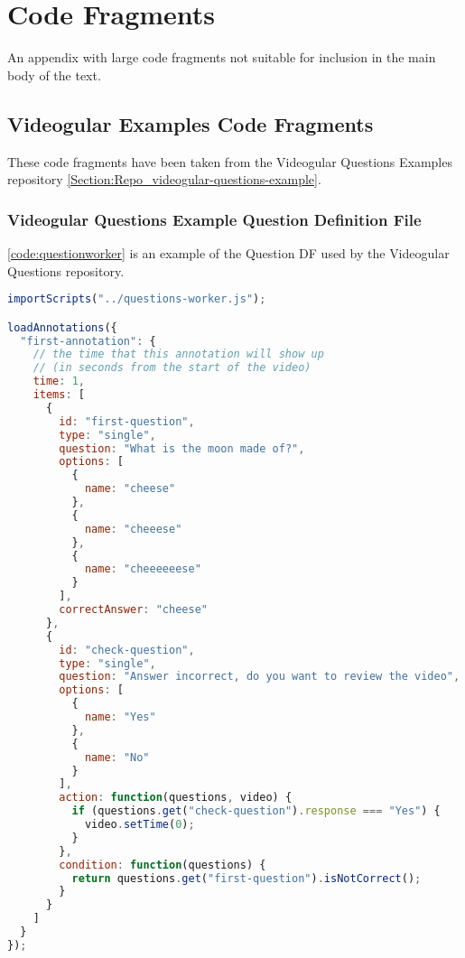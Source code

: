 \chapter{Code Fragments} \label{App:Code Fragments}

\begin{preamble}
	An appendix with large code fragments not suitable for inclusion in the main body of the text.
\end{preamble}

\section{Videogular Examples Code Fragments}

These code fragments have been taken from the Videogular Questions Examples repository \autoref{Section:Repo_videogular-questions-example}.

\subsection{Videogular Questions Example Question Definition File}

\autoref{code:questionworker} is an example of the Question \gls{DF} used by the \gls{Videogular} Questions repository.

\begin{lstlisting}[language=javascript,caption={Code for loading an annotation},label={code:questionworker} ]
importScripts("../questions-worker.js");

loadAnnotations({
  "first-annotation": {
    // the time that this annotation will show up
    // (in seconds from the start of the video)
    time: 1,
    items: [
      {
        id: "first-question",
        type: "single",
        question: "What is the moon made of?",
        options: [
          {
            name: "cheese"
          },
          {
            name: "cheeese"
          },
          {
            name: "cheeeeeese"
          }
        ],
        correctAnswer: "cheese"
      },
      {
        id: "check-question",
        type: "single",
        question: "Answer incorrect, do you want to review the video",
        options: [
          {
            name: "Yes"
          },
          {
            name: "No"
          }
        ],
        action: function(questions, video) {
          if (questions.get("check-question").response === "Yes") {
            video.setTime(0);
          }
        },
        condition: function(questions) {
          return questions.get("first-question").isNotCorrect();
        }
      }
    ]
  }
});
\end{lstlisting}

